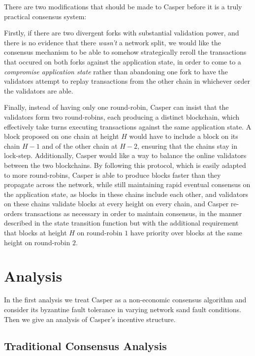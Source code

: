 \documentclass[11pt,a4paper]{article}
\begin{document}
There are two modifications that should be made to Casper before it is a truly practical consensus system:

Firstly, if there are two divergent forks with substantial validation power, and there is no evidence that there \emph{wasn't} a network split, we would like the consensus mechanism to be able to somehow strategically reroll the transactions that occured on both forks against the application state, in order to come to a \emph{compromise application state} rather than abandoning one fork to have the validators attempt to replay transactions from the other chain in whichever order the validators are able. 

Finally, instead of having only one round-robin, Casper can insist that the validators form two round-robins, each producing a distinct blockchain, which effectively take turns executing transactions against the same application state. A block proposed on one chain at height $H$ would have to include a block on its chain $H-1$ and of the other chain at $H-2$, ensuring that the chains stay in lock-step. Additionally, Casper would like a way to balance the online validators between the two blockchains. By following this protocol, which is easily adapted to more round-robins, Casper is able to produce blocks faster than they propagate across the network, while still maintaining rapid eventual consensus on the application state, as blocks in these chains include each other, and validators on these chains validate blocks at every height on every chain, and Casper re-orders transactions as necessary in order to maintain consensus, in the manner described in the state transition function but with the additional requirement that blocks at height $H$ on round-robin $1$ have priority over blocks at the same height on round-robin $2$.


\section{Analysis}

In the first analysis we treat Casper as a non-economic consensus algorithm and consider its byzantine fault tolerance in varying network sand fault conditions. Then we give an analysis of Casper's incentive structure.

\subsection{Traditional Consensus Analysis}
\end{document}
